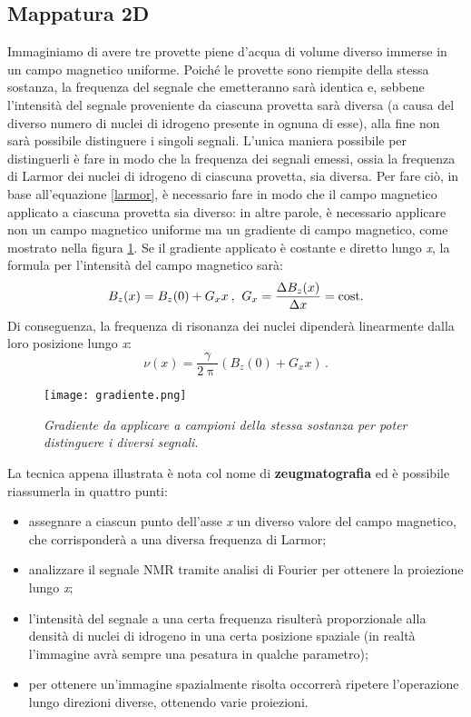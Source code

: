 \documentclass{report}
\newcommand{\figref}[1]{figura \ref{#1}}
\renewcommand{\eqref}[1]{equazione \ref{#1}}
\numberwithin{equation}{section}
\numberwithin{figure}{section}
\begin{document}
\subsection{Mappatura 2D}
Immaginiamo di avere tre provette piene d'acqua di volume diverso immerse in un campo magnetico uniforme. Poiché le provette sono riempite della stessa sostanza, la frequenza del segnale che emetteranno sarà identica e, sebbene l'intensità del segnale proveniente da ciascuna provetta sarà diversa (a causa del diverso numero di nuclei di idrogeno presente in ognuna di esse), alla fine non sarà possibile distinguere i singoli segnali. L'unica maniera possibile per distinguerli è fare in modo che la frequenza dei segnali emessi, ossia la frequenza di Larmor dei nuclei di idrogeno di ciascuna provetta, sia diversa. Per fare ciò, in base all'\eqref{larmor}, è necessario fare in modo che il campo magnetico applicato a ciascuna provetta sia diverso: in altre parole, è necessario applicare non un campo magnetico uniforme ma un gradiente di campo magnetico, come mostrato nella \figref{fig:gradiente}. Se il gradiente applicato è costante e diretto lungo \textit{x}, la formula per l'intensità del campo magnetico sarà:
\begin{equation}
    B_z(x)=B_z(0)+G_xx \hspace{2 pt}, \hspace{4 pt} G_x=\frac{\Delta B_z(x)}{\Delta x}=\mathrm{cost.}
\end{equation}
Di conseguenza, la frequenza di risonanza dei nuclei dipenderà linearmente dalla loro posizione lungo \textit{x}:
\begin{equation}
    \nu (x)= \frac{\gamma}{2\uppi}(B_z(0)+G_xx) \,.
\end{equation}

\begin{figure}[htp]
\centering
\texttt{[image: gradiente.png]}
\caption{\label{fig:gradiente} \textit{Gradiente da applicare a campioni della stessa sostanza per poter distinguere i diversi segnali}.}
\end{figure}

\noindent La tecnica appena illustrata è nota col nome di \textbf{zeugmatografia} ed è possibile riassumerla in quattro punti:
\begin{itemize}[label=$-$]
    \item assegnare a ciascun punto dell'asse \textit{x} un diverso valore del campo magnetico, che corrisponderà a una diversa frequenza di Larmor;
    \item analizzare il segnale NMR tramite analisi di Fourier per ottenere la proiezione lungo \textit{x};
    \item l'intensità del segnale a una certa frequenza risulterà proporzionale alla densità di nuclei di idrogeno in una certa posizione spaziale (in realtà l'immagine avrà sempre una pesatura in qualche parametro);
    \item per ottenere un'immagine spazialmente risolta occorrerà ripetere l'operazione lungo direzioni diverse, ottenendo varie proiezioni.
\end{itemize}
\end{document}

